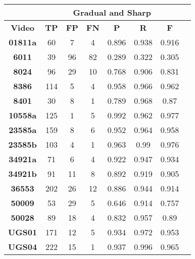 \documentclass[journal]{IEEEtran}
\begin{document}
\begin{table}[h]
\centering

\begin{tabular}{|c|c|c|c|c|c|c|c|}
\hline
& \multicolumn{6}{c|}{\textbf{Gradual and Sharp}}  \\ \hline
\textbf{Video}  & \textbf{TP} & \textbf{FP} & \textbf{FN} & \textbf{P} & \textbf{R} & \textbf{F} \\ \hline
\textbf{01811a}       & 60          & 7           & 4           & 0.896      & 0.938      & 0.916      \\ \hline
\textbf{6011}        & 39          & 96          & 82          & 0.289      & 0.322      & 0.305      \\ \hline
\textbf{8024}        & 96          & 29          & 10          & 0.768      & 0.906      & 0.831      \\ \hline
\textbf{8386}        & 114         & 5           & 4           & 0.958      & 0.966      & 0.962      \\ \hline
\textbf{8401}         & 30          & 8           & 1           & 0.789      & 0.968      & 0.87       \\ \hline
\textbf{10558a}      & 125         & 1           & 5           & 0.992      & 0.962      & 0.977      \\ \hline
\textbf{23585a}      & 159         & 8           & 6           & 0.952      & 0.964      & 0.958      \\ \hline
\textbf{23585b}      & 103         & 4           & 1           & 0.963      & 0.99       & 0.976      \\ \hline
\textbf{34921a}       & 71          & 6           & 4           & 0.922      & 0.947      & 0.934      \\ \hline
\textbf{34921b}       & 91          & 11          & 8           & 0.892      & 0.919      & 0.905      \\ \hline
\textbf{36553}       & 202         & 26          & 12          & 0.886      & 0.944      & 0.914      \\ \hline
\textbf{50009}        & 53          & 29          & 5           & 0.646      & 0.914      & 0.757      \\ \hline
\textbf{50028}        & 89          & 18          & 4           & 0.832      & 0.957      & 0.89       \\ \hline
\textbf{UGS01}       & 171         & 12          & 5           & 0.934      & 0.972      & 0.953      \\ \hline
\textbf{UGS04}       & 222         & 15          & 1           & 0.937      & 0.996      & 0.965      \\ \hline

\end{tabular}
\end{table}
\end{document}
